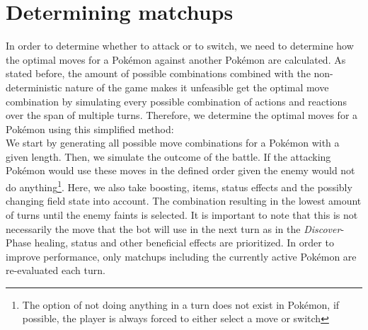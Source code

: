 \section{Determining matchups}
\label{sec:determine-matchups}
In order to determine whether to attack or to switch, we need to determine how the optimal moves for a Pokémon against
another Pokémon are calculated. As stated before, the amount of possible combinations combined with the non-deterministic
nature of the game makes it unfeasible get the optimal move combination by simulating every possible combination of 
actions and reactions over the span of multiple turns. Therefore, we determine the optimal moves for a Pokémon using 
this simplified method: \\
We start by generating all possible move combinations for a Pokémon with a given length. Then, we simulate the outcome
of the battle. If the attacking Pokémon would use these moves in the defined order given the enemy would not do 
anything\footnote{The option of not doing anything in a turn does not exist in Pokémon, if possible, the player is always 
forced to either select a move or switch}. Here, we also take boosting, items, status effects and the possibly changing
field state into account.
The combination resulting in the lowest amount of turns until the enemy faints is selected. 
It is important to note that this is not necessarily the move that the bot will use in the next turn as in the 
\textit{Discover}-Phase healing, status and other beneficial effects are prioritized. In order to improve 
performance, only matchups including the currently active Pokémon are re-evaluated each turn.

